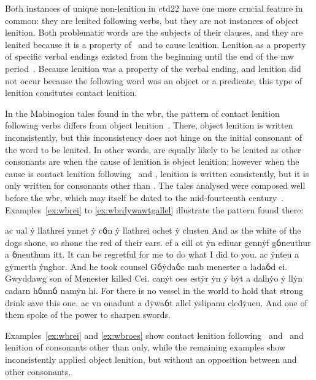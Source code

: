 Both instances of unique non-lenition in \gls{ctd22} have one more crucial feature in common: they are lenited following verbs, but they are not instances of object lenition. Both problematic words are the subjects of their clauses, and they are lenited because it is a property of \ei\ and  to cause lenition. Lenition as a property of specific verbal endings existed from the beginning until the end of the \gls{mw} period~\autocite[42]{van_development14}. Because lenition was a property of the verbal ending, and lenition did not occur because the following word was an object or a predicate, this type of lenition consitutes contact lenition.

In the Mabinogion tales found in the \gls{wbr}, the pattern of contact lenition following verbs differs from object lenition~\autocite[42, 69--70]{van_development14}. There, object lenition is written inconsistently, but this inconsistency does not hinge on the initial consonant of the word to be lenited. In other words,  are equally likely to be lenited  as other consonants are when the cause of lenition is object lenition; however when the cause is contact lenition following \ei\ and \oes, lenition is written consistently, but it is only written for consonants other than . The tales analysed were composed well before the \gls{wbr}, which may itself be dated to the mid-fourteenth century~\autocite[228]{huws_medieval_2000}. Examples~\ref{ex:wbrei} to \ref{ex:wbrdywawtgallel} illustrate the pattern found there:
\begin{mwl}
  {ac ual ẏ llathrei ynnet ẏ cỽn ẏ llathrei ochet ẏ clusteu}%
  {And as the white of the dogs shone, so shone the red of their ears.}%
  {ef a eill ot ẏn ediuar gennẏf gỽneuthur a ỽneuthum itt.}%
  {It can be regretful for me to do what I did to you.}
  {ac ẏnteu a gẏmerth ẏnghor.}%
  {And he took counsel}
  {Gỽẏdaỽc mab menester a ladaỽd ei.}%
  {Gwyddawg son of Menester killed Cei.}
  {canẏt oes estẏr ẏn ẏ bẏt a dalhẏo ẏ llẏn cadarn hỽnnỽ namẏn hi.}%
  {For there is no vessel in the world to hold that strong drink save this one.}%
  {ac vn onadunt a dẏwaỽt allel ẏslipanu cledẏueu.}%
  {And one of them spoke of the power to sharpen swords.}
\end{mwl}
Examples~\ref{ex:wbrei} and \ref{ex:wbroes} show contact lenition following \ei\ and \oes\ and lenition of consonants other than  only, while the remaining examples show inconsistently applied object lenition, but without an opposition between  and other consonants.

